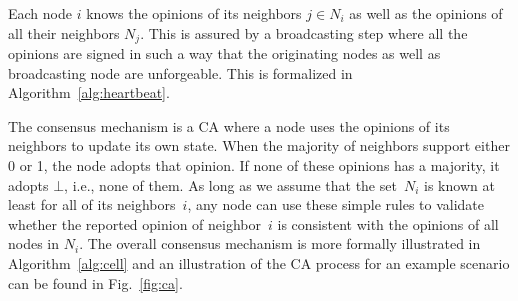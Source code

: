 \documentclass[../main.tex]{subfiles}
\begin{document}
Each node $i$ knows the opinions of its neighbors $j \in N_i$ as well as the opinions of all their neighbors $N_j$.
This is assured by a broadcasting step where all the opinions are signed in such a way that the originating nodes as well as broadcasting node are unforgeable.
This is formalized in Algorithm~\ref{alg:heartbeat}.

The consensus mechanism is a CA where a node uses the opinions of its neighbors to update its own state.
When the majority of neighbors support either 0 or 1, the node adopts that opinion.
If none of these opinions has a majority, it adopts $\bot$, i.e., none of them.
As long as we assume that the set~$N_i$ is known at least for all of its neighbors~$i$, any node can use these simple rules to validate whether the reported opinion of neighbor~$i$ is consistent with the opinions of all nodes in $N_i$.
The overall consensus mechanism is more formally illustrated in Algorithm~\ref{alg:cell} and an illustration of the CA process for an example scenario can be found in Fig.~\ref{fig:ca}.
\end{document}
